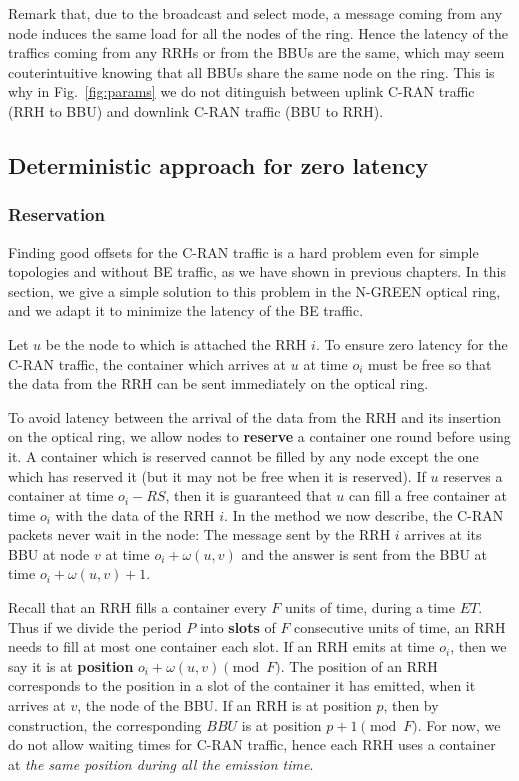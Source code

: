 Remark that, due to the broadcast and select mode, a message coming from any node induces the same load for all the nodes of the ring. Hence the latency of the traffics coming from any RRHs or from the BBUs are the same, which may seem couterintuitive knowing that all BBUs share the same node on the ring. This is why in Fig.~\ref{fig:params} we do not ditinguish between uplink C-RAN traffic (RRH to BBU) and downlink  C-RAN traffic (BBU to RRH).

\subsection{Deterministic approach for zero latency} \label{sec:deterministicalgorithms}
\subsubsection{Reservation}

Finding good offsets for the C-RAN traffic is a hard problem even for simple topologies and without BE traffic, as we have 
shown in previous chapters. In this section, we give a simple solution to this problem in the N-GREEN optical ring, and we adapt it to minimize the latency of the BE traffic.

Let $u$ be the node to which is attached the RRH $i$. To ensure zero latency for the C-RAN traffic, the container which arrives at $u$ at time $o_i$ must be free so that the data from the RRH can be sent immediately on the optical ring. 

To avoid latency between the arrival of the data from the RRH and its insertion on the optical ring, 
we allow nodes to \textbf{reserve} a container one round before using it. A container which is reserved cannot be filled by any node except the one which has reserved it (but it may not be free when it is reserved). 
If $u$ reserves a container at time $o_i - RS$, then it is guaranteed that $u$ can fill a free container at time $o_i$ with the data of the RRH $i$.
In the method we now describe, the C-RAN packets never wait in the node: The message sent by the RRH $i$ arrives at its BBU at node $v$ at time $o_i + \omega(u,v)$ and the answer is sent from the BBU at time $o_i + \omega(u,v) +1$.

Recall that an RRH fills a container every $F$ units of time, during a time $ET$. 
Thus if we divide the period $P$ into \textbf{slots} of $F$ consecutive units of time, an RRH needs to fill at most one container each slot. If an RRH emits at time $o_i$, then we say it is at \textbf{position} $o_i + \omega(u,v)\pmod F$.
The position of an RRH corresponds to the position in a slot of the container it has emitted, when it arrives at $v$, the node of the BBU. 
If an RRH is at position $p$, then by construction, the corresponding $BBU$ is at position $p+1\pmod F$. For now, we do not allow waiting times for C-RAN traffic, hence each RRH uses a container at \emph{the same position during all the emission time}. 

